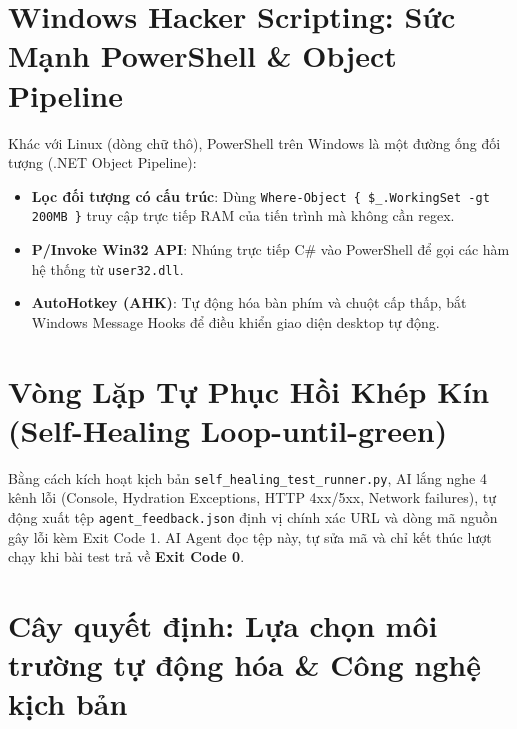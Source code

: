 \documentclass[a4paper,11pt]{report}
\begin{document}
\section{Windows Hacker Scripting: Sức Mạnh PowerShell \& Object Pipeline}
Khác với Linux (dòng chữ thô), PowerShell trên Windows là một đường ống đối tượng (.NET Object Pipeline):
\begin{itemize}[leftmargin=1.5em]
    \item \textbf{Lọc đối tượng có cấu trúc}: Dùng \texttt{Where-Object \{ \$\_.WorkingSet -gt 200MB \}} truy cập trực tiếp RAM của tiến trình mà không cần regex.
    \item \textbf{P/Invoke Win32 API}: Nhúng trực tiếp C\# vào PowerShell để gọi các hàm hệ thống từ \texttt{user32.dll}.
    \item \textbf{AutoHotkey (AHK)}: Tự động hóa bàn phím và chuột cấp thấp, bắt Windows Message Hooks để điều khiển giao diện desktop tự động.
\end{itemize}

\section{Vòng Lặp Tự Phục Hồi Khép Kín (Self-Healing Loop-until-green)}
Bằng cách kích hoạt kịch bản \texttt{self\_healing\_test\_runner.py}, AI lắng nghe 4 kênh lỗi (Console, Hydration Exceptions, HTTP 4xx/5xx, Network failures), tự động xuất tệp \texttt{agent\_feedback.json} định vị chính xác URL và dòng mã nguồn gây lỗi kèm Exit Code 1. AI Agent đọc tệp này, tự sửa mã và chỉ kết thúc lượt chạy khi bài test trả về \textbf{Exit Code 0}.

\section{Cây quyết định: Lựa chọn môi trường tự động hóa \& Công nghệ kịch bản}
\end{document}
